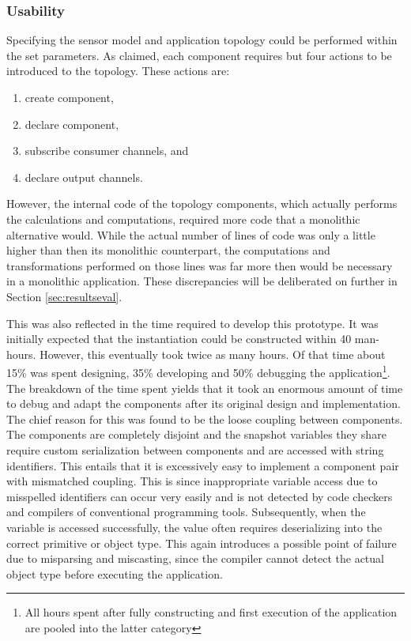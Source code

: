 \subsubsection{Usability}
Specifying the sensor model and application topology could be performed within the set parameters. As claimed, each component requires but four actions to be introduced to the topology. These actions are:
\begin{enumerate}
\nospace
\item create component, 
\item declare component, 
\item subscribe consumer channels, and 
\item declare output channels. 
\end{enumerate}
However, the internal code of the topology components, which actually performs the calculations and computations, required more code that a monolithic alternative would. While the actual number of lines of code was only a little higher than then its monolithic counterpart, the computations and transformations performed on those lines was far more then would be necessary in a monolithic application. These discrepancies will be deliberated on further in Section \ref{sec:resultseval}.

This was also reflected in the time required to develop this prototype. It was initially expected that the instantiation could be constructed within 40 man-hours. However, this eventually took twice as many hours. Of that time about 15\% was spent designing, 35\% developing and 50\% debugging the application\footnote{All hours spent after fully constructing and first execution of the application are pooled into the latter category}. The breakdown of the time spent yields that it took an enormous amount of time to debug and adapt the components after its original design and implementation. The chief reason for this was found to be the loose coupling between components. The components are completely disjoint and the snapshot variables they share require custom serialization between components and are accessed with string identifiers. This entails that it is excessively easy to implement a component pair with mismatched coupling. This is since inappropriate variable access due to misspelled identifiers can occur very easily and is not detected by code checkers and compilers of conventional programming tools. Subsequently, when the variable is accessed successfully, the value often requires deserializing into the correct primitive or object type. This again introduces a possible point of failure due to misparsing and miscasting, since the compiler cannot detect the actual object type before executing the application.

